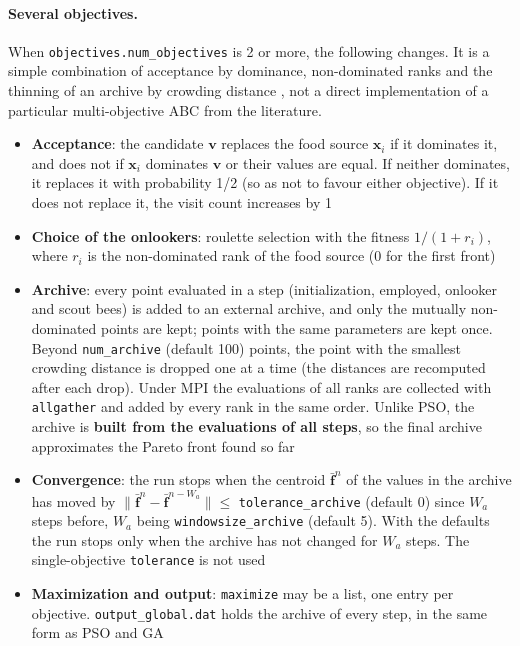 \documentclass[11pt,a4paper]{article}
\begin{document}
\paragraph{Several objectives.} When \texttt{objectives.num\_objectives} is 2 or more, the following changes. It is a simple combination of acceptance by dominance, non-dominated ranks and the thinning of an archive by crowding distance \cite{deb2002}, not a direct implementation of a particular multi-objective ABC from the literature.

\begin{itemize}
\item \textbf{Acceptance}: the candidate $\mathbf{v}$ replaces the food source $\mathbf{x}_i$ if it dominates it, and does not if $\mathbf{x}_i$ dominates $\mathbf{v}$ or their values are equal. If neither dominates, it replaces it with probability 1/2 (so as not to favour either objective). If it does not replace it, the visit count increases by 1
\item \textbf{Choice of the onlookers}: roulette selection with the fitness $1/(1 + r_i)$, where $r_i$ is the non-dominated rank of the food source (0 for the first front)
\item \textbf{Archive}: every point evaluated in a step (initialization, employed, onlooker and scout bees) is added to an external archive, and only the mutually non-dominated points are kept; points with the same parameters are kept once. Beyond \texttt{num\_archive} (default 100) points, the point with the smallest crowding distance is dropped one at a time (the distances are recomputed after each drop). Under MPI the evaluations of all ranks are collected with \texttt{allgather} and added by every rank in the same order. Unlike PSO, the archive is \textbf{built from the evaluations of all steps}, so the final archive approximates the Pareto front found so far
\item \textbf{Convergence}: the run stops when the centroid $\bar{\mathbf{f}}^n$ of the values in the archive has moved by $\|\bar{\mathbf{f}}^n - \bar{\mathbf{f}}^{n-W_a}\| \le$ \texttt{tolerance\_archive} (default 0) since $W_a$ steps before, $W_a$ being \texttt{windowsize\_archive} (default 5). With the defaults the run stops only when the archive has not changed for $W_a$ steps. The single-objective \texttt{tolerance} is not used
\item \textbf{Maximization and output}: \texttt{maximize} may be a list, one entry per objective. \texttt{output\_global.dat} holds the archive of every step, in the same form as PSO and GA
\end{itemize}
\end{document}
